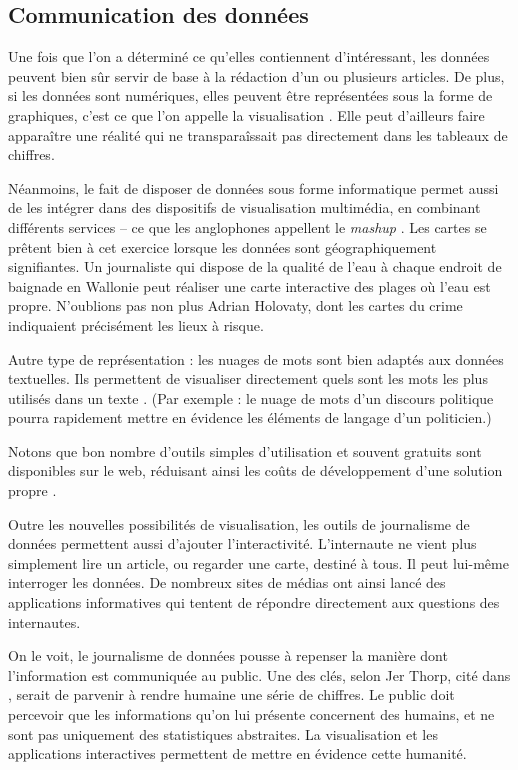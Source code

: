 \subsection{Communication des données}

Une fois que l'on a déterminé ce qu'elles contiennent d'intéressant, les données peuvent bien sûr servir de base à la rédaction d'un ou plusieurs articles. De plus, si les données sont numériques, elles peuvent être représentées sous la forme de 
graphiques, c'est ce que l'on appelle la visualisation \cite{handbook, bradshaw}. Elle peut d'ailleurs faire apparaître une réalité qui ne transparaîssait pas directement dans 
les tableaux de chiffres. 

Néanmoins, le fait de disposer de données sous forme informatique permet aussi de 
les intégrer dans des dispositifs de visualisation multimédia, en combinant différents services -- ce que les anglophones appellent le \textit{mashup} \cite{bradshaw}. Les cartes se prêtent bien à cet exercice lorsque les données sont géographiquement signifiantes. Un journaliste qui dispose de la qualité
de l'eau à chaque endroit de baignade en Wallonie peut réaliser une carte interactive
des plages où l'eau est propre. N'oublions pas non plus Adrian Holovaty, dont les \og 
cartes du crime \fg indiquaient précisément les lieux à risque.

Autre type de représentation : les \og nuages de mots \fg sont bien adaptés aux données textuelles. Ils 
permettent de visualiser directement quels sont les mots les plus utilisés dans un texte \cite{bradshaw}. (Par exemple : le nuage de mots d'un discours politique pourra rapidement mettre en évidence les éléments de langage d'un politicien.)

Notons que bon nombre d'outils simples d'utilisation et souvent gratuits sont 
disponibles sur le web, réduisant ainsi les coûts de développement d'une solution
propre \cite{actuvisu}.


Outre les nouvelles possibilités de visualisation, les outils de journalisme de
données permettent aussi d'ajouter l'interactivité. L'internaute ne vient plus
simplement lire un article, ou regarder une carte, destiné à tous. Il peut lui-même
interroger les données. De nombreux sites de médias ont ainsi lancé des 
applications informatives qui tentent de répondre directement aux questions des internautes.

On le voit, le journalisme de données pousse à repenser la manière dont l'information 
est communiquée au public. Une des clés, selon Jer Thorp, cité dans \cite{handbookfr}, 
serait de parvenir à rendre \og humaine \fg une série de chiffres. Le public doit 
percevoir que les informations qu'on lui présente concernent des humains, et ne sont 
pas uniquement des statistiques abstraites. La visualisation et les applications 
interactives permettent de mettre en évidence cette humanité. 

